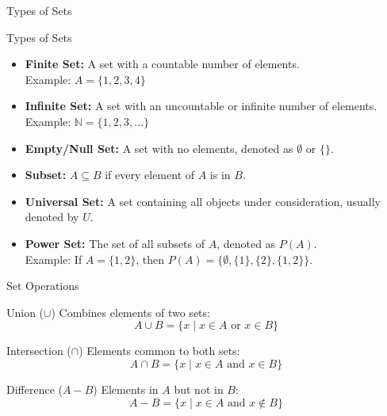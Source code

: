 \documentclass{beamer}
\begin{document}
\begin{frame}{Types of Sets}
  \begin{block}{Types of Sets}
      \begin{itemize}
          \item \textbf{Finite Set:} A set with a countable number of elements. \\
          Example: \(A = \{1, 2, 3, 4\}\)
          
          \item \textbf{Infinite Set:} A set with an uncountable or infinite number of elements. \\
          Example: \(\mathbb{N} = \{1, 2, 3, \dots\}\)

          \item \textbf{Empty/Null Set:} A set with no elements, denoted as \(\emptyset\) or \(\{\}\).

          \item \textbf{Subset:} \(A \subseteq B\) if every element of \(A\) is in \(B\).

          \item \textbf{Universal Set:} A set containing all objects under consideration, usually denoted by \(U\).

          \item \textbf{Power Set:} The set of all subsets of \(A\), denoted as \(P(A)\). \\
          Example: If \(A = \{1, 2\}\), then \(P(A) = \{\emptyset, \{1\}, \{2\}, \{1, 2\}\}\).
      \end{itemize}
  \end{block}
\end{frame}

\begin{frame}{Set Operations}
  \begin{block}{Union (\(\cup\))}
      Combines elements of two sets:
      \[
      A \cup B = \{x \mid x \in A \text{ or } x \in B\}
      \]
  \end{block}

  \begin{block}{Intersection (\(\cap\))}
      Elements common to both sets:
      \[
      A \cap B = \{x \mid x \in A \text{ and } x \in B\}
      \]
  \end{block}

  \begin{block}{Difference (\(A - B\))}
      Elements in \(A\) but not in \(B\):
      \[
      A - B = \{x \mid x \in A \text{ and } x \notin B\}
      \]
  \end{block}

\end{frame}
\end{document}
